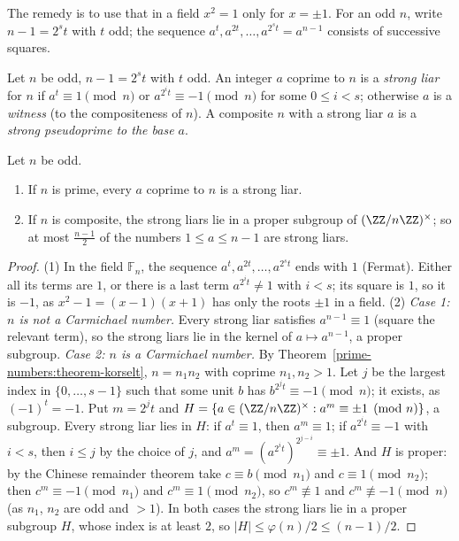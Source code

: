 The remedy is to use that in a field $x^2 = 1$ only for $x = \pm 1$. For an odd $n$, write $n - 1 = 2^st$ with $t$ odd; the sequence $a^t, a^{2t}, \ldots, a^{2^st} = a^{n-1}$ consists of successive
squares.

\begin{definition}\label{prime-numbers:definition-strong-liar}
Let $n$ be odd, $n - 1 = 2^st$ with $t$ odd. An integer $a$ coprime to $n$ is a \emph{strong liar} for $n$ if $a^t \equiv 1 \pmod n$ or $a^{2^it} \equiv -1 \pmod n$ for some $0 \leq i < s$; otherwise
$a$ is a \emph{witness} (to the compositeness of $n$). A composite $n$ with a strong liar $a$ is a \emph{strong pseudoprime to the base $a$}.
\end{definition}

\begin{theorem}\label{prime-numbers:theorem-miller-rabin}
Let $n$ be odd.
\begin{enumerate}
\item If $n$ is prime, every $a$ coprime to $n$ is a strong liar.
\item If $n$ is composite, the strong liars lie in a proper subgroup of $(\ZZ/n\ZZ)^\times$; so at most $\frac{n-1}{2}$ of the numbers $1 \leq a \leq n - 1$ are strong liars.
\end{enumerate}
\end{theorem}

\begin{proof}
(1) In the field $\mathbb{F}_n$, the sequence $a^t, a^{2t}, \ldots, a^{2^st}$ ends with $1$ (Fermat). Either all its terms are $1$, or there is a last term $a^{2^it} \neq 1$ with $i < s$; its square is $1$, so it
is $-1$, as $x^2 - 1 = (x - 1)(x + 1)$ has only the roots $\pm 1$ in a field.
(2) \emph{Case 1: $n$ is not a Carmichael number.} Every strong liar satisfies $a^{n-1} \equiv 1$ (square the relevant term), so the strong liars lie in the kernel of $a \mapsto a^{n-1}$, a proper
subgroup.
\emph{Case 2: $n$ is a Carmichael number.} By Theorem~\ref{prime-numbers:theorem-korselt}, $n = n_1n_2$ with coprime $n_1, n_2 > 1$. Let $j$ be the largest index in $\{0, \ldots, s - 1\}$ such that
some unit $b$ has $b^{2^jt} \equiv -1 \pmod n$; it exists, as $(-1)^t = -1$. Put $m = 2^jt$ and $H = \{a \in (\ZZ/n\ZZ)^\times : a^m \equiv \pm 1 \pmod n\}$, a subgroup. Every strong liar lies in $H$: if
$a^t \equiv 1$, then $a^m \equiv 1$; if $a^{2^it} \equiv -1$ with $i < s$, then $i \leq j$ by the choice of $j$, and $a^m = (a^{2^it})^{2^{j-i}} \equiv \pm 1$. And $H$ is proper: by the Chinese remainder
theorem take $c \equiv b \pmod{n_1}$ and $c \equiv 1 \pmod{n_2}$; then $c^m \equiv -1 \pmod{n_1}$ and $c^m \equiv 1 \pmod{n_2}$, so $c^m \not\equiv 1$ and $c^m \not\equiv -1 \pmod n$ (as $n_1$, $n_2$ are odd
and $> 1$).
In both cases the strong liars lie in a proper subgroup $H$, whose index is at least $2$, so $|H| \leq \varphi(n)/2 \leq (n - 1)/2$.
\end{proof}


